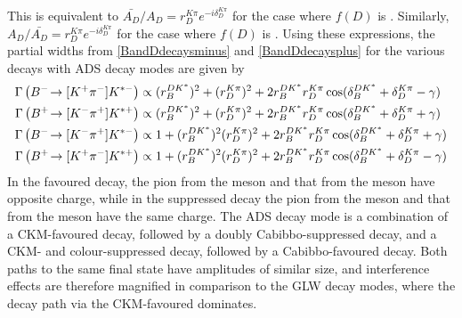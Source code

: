This is equivalent to $\bar{A_{D}}/A_{D} = r_D^{K\pi}e^{-i\delta_D^{K\pi}}$ for the case where $f(D)$ is \Km\pip. Similarly, $A_{D}/\bar{A_{D}} = r_D^{K\pi}e^{-i\delta_D^{K\pi}}$ for the case where $f(D)$ is \Kp\pim. Using these expressions, the partial widths from \eqn\ref{BandDdecaysminus} and \ref{BandDdecaysplus} for the various \decay{\Bpm}{\D\Kstarpm} decays with ADS decay modes are given by
\begin{align}
\Gamma\left({{{B}^-}}\!\rightarrow [{{K}^+}{{\pi}^-}]{\ensuremath{{K}^{*-}}}\right) &\propto (r_B^{DK^*})^2 + (r_D^{K\pi})^2 + 2r_B^{DK^*}r_D^{K\pi}\cos(\delta_B^{DK^*} + \delta_D^{K\pi} - \gamma) \label{adsBdecaym} \\
\Gamma\left({{{B}^+}}\!\rightarrow [{{K}^-}{{\pi}^+}]{\ensuremath{{K}^{*+}}}\right) &\propto (r_B^{DK^*})^2 + (r_D^{K\pi})^2 + 2r_B^{DK^*}r_D^{K\pi}\cos(\delta_B^{DK^*} + \delta_D^{K\pi} + \gamma) \label{adsBdecayp} \\
\Gamma\left({{{B}^-}}\!\rightarrow [{{K}^-}{{\pi}^+}]{\ensuremath{{K}^{*-}}}\right) &\propto 1 + (r_B^{DK^*})^2(r_D^{K\pi})^2 + 2r_B^{DK^*}r_D^{K\pi}\cos(\delta_B^{DK^*} + \delta_D^{K\pi} + \gamma) \label{favBdecaym} \\
\Gamma\left({{{B}^+}}\!\rightarrow [{{K}^+}{{\pi}^-}]{\ensuremath{{K}^{*+}}}\right) &\propto 1 + (r_B^{DK^*})^2(r_D^{K\pi})^2 + 2r_B^{DK^*}r_D^{K\pi}\cos(\delta_B^{DK^*} + \delta_D^{K\pi} - \gamma) \label{favBdecayp} 
\end{align}
In the favoured decay, the pion from the \D meson and that from the \Kstarm meson have opposite charge, while in the suppressed decay the pion from the \D meson and that from the \Kstarm meson have the same charge. The ADS decay mode is a combination of a CKM-favoured \decay{\Bm}{\Dz\Kstarm} decay, followed by a doubly Cabibbo-suppressed \decay{\Dz}{\Kp\pim} decay, and a CKM- and colour-suppressed \decay{\Bm}{\Dzb\Kstarm} decay, followed by a Cabibbo-favoured \decay{\Dzb}{\Kp\pim} decay. Both paths to the same final state have amplitudes of similar size, and interference effects are therefore magnified in comparison to the GLW decay modes, where the decay path via the CKM-favoured \decay{\Bm}{\Dz\Kstarm} dominates.

